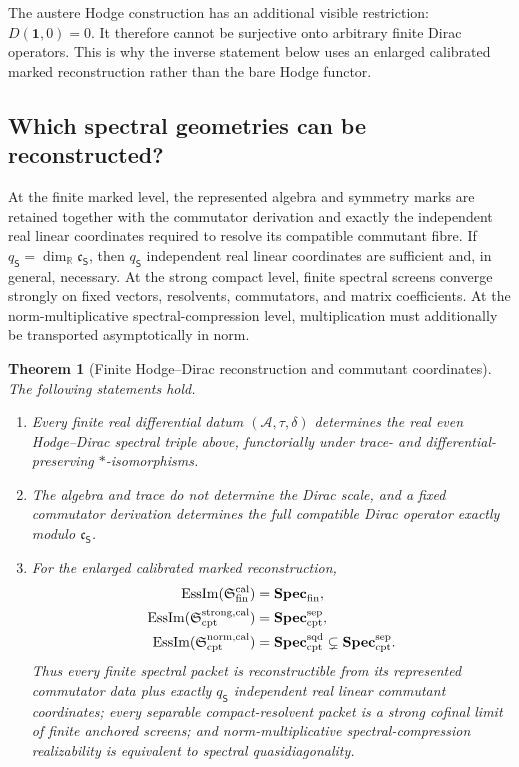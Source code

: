 \documentclass[11pt]{article}
\newtheorem{theorem}{Theorem}[section]
\theoremstyle{definition}
\theoremstyle{remark}
\theoremstyle{definition}
\theoremstyle{remark}
\newcommand{\R}{\mathbb R}
\newcommand{\one}{\mathbf 1}
\newcommand{\A}{\mathcal A}
\newcommand{\EssIm}{\operatorname{EssIm}}
\begin{document}
The austere Hodge construction has an additional visible restriction:
$D(\one,0)=0$.  It therefore cannot be surjective onto arbitrary finite Dirac
operators.  This is why the inverse statement below uses an enlarged calibrated
marked reconstruction rather than the bare Hodge functor.

\subsection{Which spectral geometries can be reconstructed?}

At the finite marked level, the represented algebra and symmetry marks are retained
together with the commutator derivation and exactly the independent real linear coordinates required
to resolve its compatible commutant fibre.  If
$q_{\mathsf S}=\dim_{\R}\mathfrak c_{\mathsf S}$, then $q_{\mathsf S}$
independent real linear coordinates are sufficient and, in general, necessary.  At the strong
compact level, finite spectral screens converge strongly on fixed vectors,
resolvents, commutators, and matrix coefficients.  At the norm-multiplicative spectral-compression
level, multiplication must additionally be transported asymptotically in norm.

\begin{theorem}[Finite Hodge--Dirac reconstruction and commutant coordinates]
\label{thm:summary-finite}
The following statements hold.
\begin{enumerate}[label=\textup{(\roman*)},leftmargin=2.8em]
\item Every finite real differential datum $(\A,\tau,\delta)$ determines the real even
Hodge--Dirac spectral triple above, functorially under trace- and
 differential-preserving $*$-isomorphisms.
\item The algebra and trace do not determine the Dirac scale, and a fixed commutator
 derivation determines the full compatible Dirac operator exactly modulo
 $\mathfrak c_{\mathsf S}$.
\item For the enlarged calibrated marked reconstruction,
\begin{equation}
\begin{aligned}
\EssIm(\mathfrak S_{\rm fin}^{\rm cal})
  &=\mathbf{Spec}_{\rm fin},\\
\EssIm(\mathfrak S_{\rm cpt}^{\rm strong,cal})
  &=\mathbf{Spec}_{\rm cpt}^{\rm sep},\\
\EssIm(\mathfrak S_{\rm cpt}^{\rm norm,cal})
  &=\mathbf{Spec}_{\rm cpt}^{\rm sqd}
  \subsetneq\mathbf{Spec}_{\rm cpt}^{\rm sep}.
\end{aligned}
\label{eq:summary-essential-image}
\end{equation}
Thus every finite spectral packet is reconstructible from its represented
commutator data plus exactly $q_{\mathsf S}$ independent real linear commutant coordinates; every
separable compact-resolvent packet is a strong cofinal limit of finite anchored
screens; and norm-multiplicative spectral-compression realizability is equivalent to spectral
quasidiagonality.
\end{enumerate}
\end{theorem}
\end{document}
